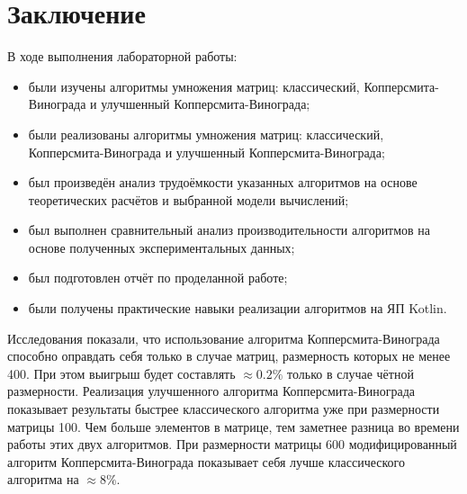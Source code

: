 \documentclass[12pt]{report}
\begin{document}
\chapter*{Заключение}
В ходе выполнения лабораторной работы:
\begin{itemize}
\item были изучены алгоритмы умножения матриц: классический, Копперсмита-Винограда и улучшенный Копперсмита-Винограда;
\item были реализованы алгоритмы умножения матриц: классический, Копперсмита-Винограда и улучшенный Копперсмита-Винограда;
\item был произведён анализ трудоёмкости указанных алгоритмов на основе теоретических расчётов и выбранной модели вычислений;
\item был выполнен сравнительный анализ производительности алгоритмов на основе полученных экспериментальных данных;
\item был подготовлен отчёт по проделанной работе;
\item были получены практические навыки реализации алгоритмов на ЯП Kotlin.
\end{itemize}

Исследования показали, что использование алгоритма Копперсмита-Винограда способно оправдать себя только в случае матриц, размерность которых не менее 400. При этом выигрыш будет составлять $\approx0.2\%$ только в случае чётной размерности. Реализация улучшенного алгоритма Копперсмита-Винограда показывает результаты быстрее классического алгоритма уже при размерности матрицы 100. Чем больше элементов в матрице, тем заметнее разница во времени работы этих двух алгоритмов. При размерности матрицы 600 модифицированный алгоритм Копперсмита-Винограда показывает себя лучше классического алгоритма на $\approx8\%$.

\end{document}
